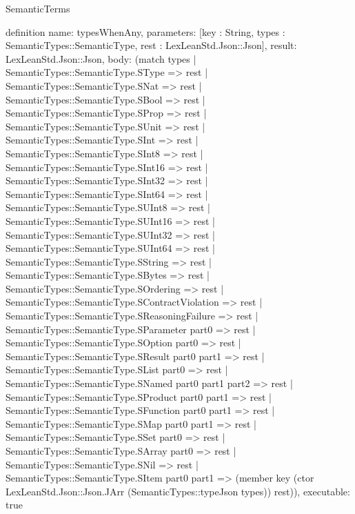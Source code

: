 \begin{lexlean}{SemanticTerms}
\begin{semanticmodule}
definition{
  name: typesWhenAny,
  parameters: [key : String, types : SemanticTypes::SemanticType, rest : LexLeanStd.Json::Json],
  result: LexLeanStd.Json::Json,
  body: (match types
    | SemanticTypes::SemanticType.SType => rest
    | SemanticTypes::SemanticType.SNat => rest
    | SemanticTypes::SemanticType.SBool => rest
    | SemanticTypes::SemanticType.SProp => rest
    | SemanticTypes::SemanticType.SUnit => rest
    | SemanticTypes::SemanticType.SInt => rest
    | SemanticTypes::SemanticType.SInt8 => rest
    | SemanticTypes::SemanticType.SInt16 => rest
    | SemanticTypes::SemanticType.SInt32 => rest
    | SemanticTypes::SemanticType.SInt64 => rest
    | SemanticTypes::SemanticType.SUInt8 => rest
    | SemanticTypes::SemanticType.SUInt16 => rest
    | SemanticTypes::SemanticType.SUInt32 => rest
    | SemanticTypes::SemanticType.SUInt64 => rest
    | SemanticTypes::SemanticType.SString => rest
    | SemanticTypes::SemanticType.SBytes => rest
    | SemanticTypes::SemanticType.SOrdering => rest
    | SemanticTypes::SemanticType.SContractViolation => rest
    | SemanticTypes::SemanticType.SReasoningFailure => rest
    | SemanticTypes::SemanticType.SParameter part0 => rest
    | SemanticTypes::SemanticType.SOption part0 => rest
    | SemanticTypes::SemanticType.SResult part0 part1 => rest
    | SemanticTypes::SemanticType.SList part0 => rest
    | SemanticTypes::SemanticType.SNamed part0 part1 part2 => rest
    | SemanticTypes::SemanticType.SProduct part0 part1 => rest
    | SemanticTypes::SemanticType.SFunction part0 part1 => rest
    | SemanticTypes::SemanticType.SMap part0 part1 => rest
    | SemanticTypes::SemanticType.SSet part0 => rest
    | SemanticTypes::SemanticType.SArray part0 => rest
    | SemanticTypes::SemanticType.SNil => rest
    | SemanticTypes::SemanticType.SItem part0 part1 => (member key (ctor LexLeanStd.Json::Json.JArr (SemanticTypes::typeJson types)) rest)),
  executable: true
}


\end{semanticmodule}
\end{lexlean}
